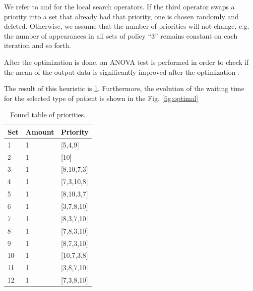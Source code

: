 We refer to \cite{paraskevopoulos2008reactive} and \cite{fosin2014vehicle} for the local search operators. If the third operator swaps a priority into a set that already had that priority, one is chosen randomly and deleted. Otherwise, we assume that the number of priorities will not change, e.g. the number of appearances in all sets of policy ``3'' remains constant on each iteration and so forth.

After the optimization is done, an ANOVA test is performed in order to check if the mean of the output data is significantly improved after the optimization \cite[pp. 662-665]{wackerly2010estadistica}. 

The result of this heuristic is \ref{tab:optimal}. Furthermore, the evolution of the waiting time for the selected type of patient is shown in the Fig. \ref{fig:optimal}

\begin{table}[H]
\centering
\begin{tabular}{lll}
\hline
Set & Amount & Priority       \\ \hline
1   & 1      & {[}5,4,9{]}    \\
2   & 1      & {[}10{]}       \\
3   & 1      & {[}8,10,7,3{]} \\
4   & 1      & {[}7,3,10,8{]} \\
5   & 1      & {[}8,10,3,7{]} \\
6   & 1      & {[}3,7,8,10{]} \\
7   & 1      & {[}8,3,7,10{]} \\
8   & 1      & {[}7,8,3,10{]} \\
9   & 1      & {[}8,7,3,10{]} \\
10  & 1      & {[}10,7,3,8{]} \\
11  & 1      & {[}3,8,7,10{]} \\
12  & 1      & {[}7,3,8,10{]} \\ \hline
\end{tabular}
\caption{Found table of priorities.}
\label{tab:optimal}
\end{table}

